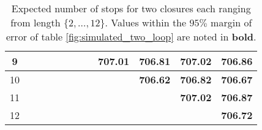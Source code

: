 \begin{table}[H]
\begin{adjustbox}{max width=\textwidth,max height=2\textheight}
\begin{tabular}{|c|c|c|c|c|c|c|c|c|c|c|c|}
  \hline
  9 &               &               &               &               &               &               &               & \textbf{707.01} & \textbf{706.81} & \textbf{707.02} & \textbf{706.86} \\
  \hline
  10 &              &               &               &               &               &               &               &               & \textbf{706.62} & \textbf{706.82} & \textbf{706.67} \\
  \hline
  11 &              &               &               &               &               &               &               &               &               & \textbf{707.02} & \textbf{706.87} \\
  \hline
  12 &              &               &               &               &               &               &               &               &               &               & \textbf{706.72} \\
  \hline
\end{tabular}

  \end{adjustbox}
  \caption{Expected number of stops for two closures each ranging
    from length $\{2,\dots,12\}$. Values within the $95\%$ margin of
    error of table \protect\ref{fig:simulated_two_loop} are noted in
  \textbf{bold}.}
\end{table}

